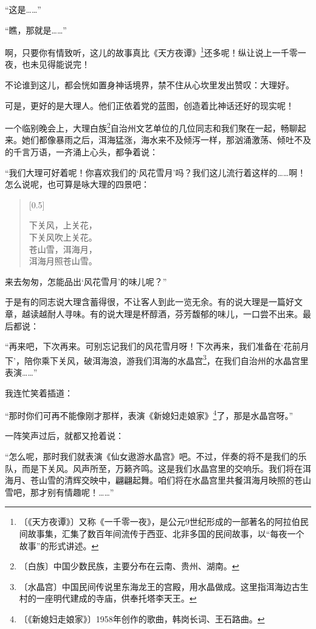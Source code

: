 \documentclass[12pt,UTF-8,openany]{ctexbook}
\begin{document}
\begin{normalsize}
    “这是……”
    
    “瞧，那就是……”
    
    啊，只要你有情致听，这儿的故事真比《天方夜谭》\footnote{〔《天方夜谭》〕又称《一千零一夜》，是公元9世纪形成的一部著名的阿拉伯民间故事集，汇集了数百年间流传于西亚、北非多国的民间故事，以“每夜一个故事”的形式讲述。}还多呢！纵让说上一千零一夜，也未见得能说完！
    
    不论谁到这儿，都会恍如置身神话境界，禁不住从心坎里发出赞叹：大理好。
    
    可是，更好的是大理人。他们正依着党的蓝图，创造着比神话还好的现实呢！
    
    一个临别晚会上，大理白族\footnote{〔白族〕中国少数民族，主要分布在云南、贵州、湖南。}自治州文艺单位的几位同志和我们聚在一起，畅聊起来。她们都像暴雨之后，洱海猛涨，海水来不及倾泻一样，那汹涌激荡、倾吐不及的千言万语，一齐涌上心头，都争着说：
    
    “我们大理可好着呢！你喜欢我们的‘风花雪月’吗？我们这儿流行着这样的……啊！怎么说呢，也可算是咏大理的四景吧：
    
    \begin{verse}[0.5\linewidth]
    
    下关风，上关花，\\ 下关风吹上关花。\\苍山雪，洱海月，\\洱海月照苍山雪。
    
    \end{verse}
    
    来去匆匆，怎能品出‘风花雪月’的味儿呢？”
    
    于是有的同志说大理含蓄得很，不让客人到此一览无余。有的说大理是一篇好文章，越读越耐人寻味。有的说大理是杯醇酒，芬芳馥郁的味儿，一口尝不出来。最后都说：
    
    “再来吧，下次再来。可别忘记我们的风花雪月呀！下次再来，我们准备在‘花前月下’，陪你乘下关风，破洱海浪，游我们洱海的水晶宫\footnote{〔水晶宫〕中国民间传说里东海龙王的宫殿，用水晶做成。这里指洱海边古生村的一座明代建成的寺庙，供奉托塔李天王。}，在我们自治州的水晶宫里表演……”
    
    我连忙笑着插道：
    
    “那时你们可再不能像刚才那样，表演《新媳妇走娘家》\footnote{〔《新媳妇走娘家》〕1958年创作的歌曲，韩岗长词、王石路曲。}了，那是水晶宫呀。”
    
    一阵笑声过后，就都又抢着说：
    
    “怎么呢，那时我们就表演《仙女遨游水晶宫》吧。不过，伴奏的将不是我们的乐队，而是下关风。风声所至，万籁齐鸣。这是我们水晶宫里的交响乐。我们将在洱海月、苍山雪的清辉交映中，翩翩起舞。咱们将在水晶宫里共餐洱海月映照的苍山雪吧，那才别有情趣呢！……”
    

\end{normalsize}
\end{document}
